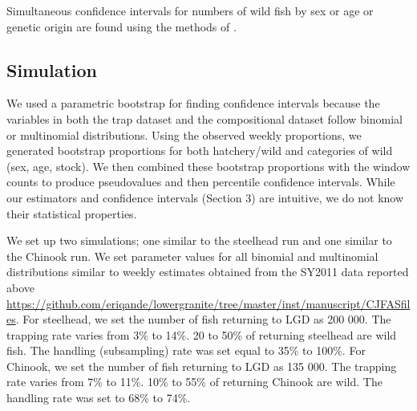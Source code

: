 \documentclass[%
                leqno,         %
%
]{nrc1}                          %
\begin{document}
Simultaneous confidence intervals for numbers of wild fish by sex or age or genetic origin are found using the methods of \citet{Mandel2008}.

\subsection*{Simulation} 

We used a parametric bootstrap for finding confidence intervals because the variables in both the trap dataset and the compositional dataset follow binomial or multinomial distributions. Using the observed weekly proportions, we generated bootstrap proportions for both  hatchery/wild and categories of wild (sex, age, stock). We then combined these bootstrap proportions with the window counts to produce pseudovalues and then percentile confidence intervals. While our estimators and confidence intervals (Section 3) are intuitive, we do not know their statistical properties.

We set up two simulations; one similar to the steelhead run and one similar to the Chinook run. We set parameter values for all binomial and multinomial distributions similar to weekly estimates obtained from the SY2011 data reported above \url{https://github.com/eriqande/lowergranite/tree/master/inst/manuscript/CJFASfiles}. For steelhead, we set the number of fish returning to LGD as 200 000. The trapping rate varies from 3\% to 14\%. 20 to 50\% of returning steelhead are wild fish. The handling (subsampling) rate was set equal to 35\% to 100\%. For Chinook, we set the number of fish returning to LGD as 135 000. The trapping rate varies from 7\% to 11\%. 10\% to 55\% of returning Chinook are wild. The handling rate was set to 68\% to 74\%.
\end{document}
